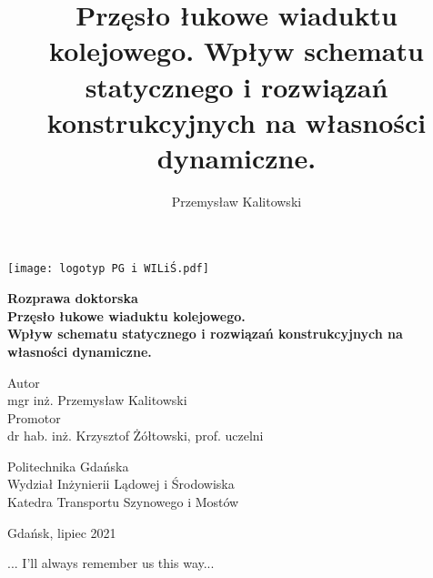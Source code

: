 
\title{Przęsło łukowe wiaduktu kolejowego. Wpływ schematu statycznego i rozwiązań konstrukcyjnych na własności dynamiczne.}
\author{Przemysław Kalitowski}










	
\begin{titlepage}
	\begin{center}
		\texttt{[image: logotyp PG i WILiŚ.pdf]}
		\vspace{3cm}
		
		\Large
		\textbf{Rozprawa doktorska\\}
		\vspace{1cm}
		\LARGE
		\textbf{Przęsło łukowe wiaduktu kolejowego.\\Wpływ schematu statycznego i rozwiązań konstrukcyjnych na własności dynamiczne.}
		
	
		\vspace{2cm}
		
		\large
		Autor\\mgr inż. Przemysław Kalitowski \\
		\vspace{0.5cm}
		Promotor\\dr hab. inż. Krzysztof Żółtowski, prof. uczelni
		\vfill
		

		\large
		
		Politechnika Gdańska\\
		Wydział Inżynierii Lądowej i Środowiska\\
		Katedra Transportu Szynowego i Mostów
		
		\vspace{1cm}
		Gdańsk, lipiec 2021
		
	\end{center}
\end{titlepage}


\myemptypage

\vspace*{20cm}
\hfill ... I'll always remember us this way...
\newpage

\myemptypage

\tableofcontents

